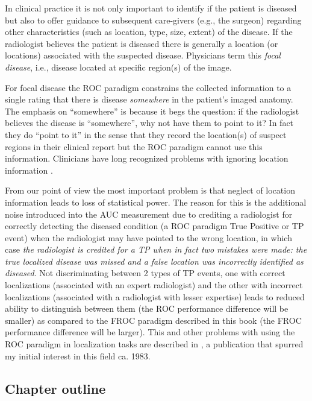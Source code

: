 \documentclass[
]{book}
\begin{document}
In clinical practice it is not only important to identify if the patient is diseased but also to offer guidance to subsequent care-givers (e.g., the surgeon) regarding other characteristics (such as location, type, size, extent) of the disease. If the radiologist believes the patient is diseased there is generally a location (or locations) associated with the suspected disease. Physicians term this \emph{focal disease}, i.e., disease located at specific region(s) of the image.

For focal disease the ROC paradigm constrains the collected information to a single rating that there is disease \emph{somewhere} in the patient's imaged anatomy. The emphasis on ``somewhere'' is because it begs the question: if the radiologist believes the disease is ``somewhere'', why not have them to point to it? In fact they do ``point to it'' in the sense that they record the location(s) of suspect regions in their clinical report but the ROC paradigm cannot use this information. Clinicians have long recognized problems with ignoring location information \citep{BlackDwyer1990, RN1921}.

From our point of view the most important problem is that neglect of location information leads to loss of statistical power. The reason for this is the additional noise introduced into the AUC measurement due to crediting a radiologist for correctly detecting the diseased condition (a ROC paradigm True Positive or TP event) when the radiologist may have pointed to the wrong location, in which case \emph{the radiologist is credited for a TP when in fact two mistakes were made: the true localized disease was missed and a false location was incorrectly identified as diseased}. Not discriminating between 2 types of TP events, one with correct localizations (associated with an expert radiologist) and the other with incorrect localizations (associated with a radiologist with lesser expertise) leads to reduced ability to distinguish between them (the ROC performance difference will be smaller) as compared to the FROC paradigm described in this book (the FROC performance difference will be larger). This and other problems with using the ROC paradigm in localization tasks are described in \citep{bunch1977free}, a publication that spurred my initial interest in this field \citep{Chakraborty1986DigitalVsConv} ca. 1983.

\hypertarget{froc-paradigm-outline}{%
\subsection{Chapter outline}\label{froc-paradigm-outline}}
\end{document}
